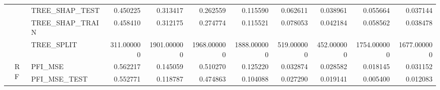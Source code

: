 \begin{table}
\begin{tabular}{lllrrrrrrrr}
 &  & TREE\_SHAP\_TEST & {\cellcolor[HTML]{B40426}} \color[HTML]{F1F1F1} 0.450225 & {\cellcolor[HTML]{F7B79B}} \color[HTML]{000000} 0.313417 & {\cellcolor[HTML]{E8D6CC}} \color[HTML]{000000} 0.262559 & {\cellcolor[HTML]{779AF7}} \color[HTML]{F1F1F1} 0.115590 & {\cellcolor[HTML]{4C66D6}} \color[HTML]{F1F1F1} 0.062611 & {\cellcolor[HTML]{3C4EC2}} \color[HTML]{F1F1F1} 0.038961 & {\cellcolor[HTML]{485FD1}} \color[HTML]{F1F1F1} 0.055664 & {\cellcolor[HTML]{3B4CC0}} \color[HTML]{F1F1F1} 0.037144 \\
 &  & TREE\_SHAP\_TRAIN & {\cellcolor[HTML]{B40426}} \color[HTML]{F1F1F1} 0.458410 & {\cellcolor[HTML]{F6BDA2}} \color[HTML]{000000} 0.312175 & {\cellcolor[HTML]{ECD3C5}} \color[HTML]{000000} 0.274774 & {\cellcolor[HTML]{7597F6}} \color[HTML]{F1F1F1} 0.115521 & {\cellcolor[HTML]{5875E1}} \color[HTML]{F1F1F1} 0.078053 & {\cellcolor[HTML]{3D50C3}} \color[HTML]{F1F1F1} 0.042184 & {\cellcolor[HTML]{4961D2}} \color[HTML]{F1F1F1} 0.058562 & {\cellcolor[HTML]{3B4CC0}} \color[HTML]{F1F1F1} 0.038478 \\
 &  & TREE\_SPLIT & {\cellcolor[HTML]{3B4CC0}} \color[HTML]{F1F1F1} 311.000000 & {\cellcolor[HTML]{C32E31}} \color[HTML]{F1F1F1} 1901.000000 & {\cellcolor[HTML]{B40426}} \color[HTML]{F1F1F1} 1968.000000 & {\cellcolor[HTML]{C53334}} \color[HTML]{F1F1F1} 1888.000000 & {\cellcolor[HTML]{6282EA}} \color[HTML]{F1F1F1} 519.000000 & {\cellcolor[HTML]{5470DE}} \color[HTML]{F1F1F1} 452.000000 & {\cellcolor[HTML]{DF634E}} \color[HTML]{F1F1F1} 1754.000000 & {\cellcolor[HTML]{E9785D}} \color[HTML]{F1F1F1} 1677.000000 \\
\cline{2-11}
 & \multirow[c]{9}{*}{RF} & PFI\_MSE & {\cellcolor[HTML]{B40426}} \color[HTML]{F1F1F1} 0.562217 & {\cellcolor[HTML]{86A9FC}} \color[HTML]{F1F1F1} 0.145059 & {\cellcolor[HTML]{D55042}} \color[HTML]{F1F1F1} 0.510270 & {\cellcolor[HTML]{7A9DF8}} \color[HTML]{F1F1F1} 0.125220 & {\cellcolor[HTML]{4257C9}} \color[HTML]{F1F1F1} 0.032874 & {\cellcolor[HTML]{3F53C6}} \color[HTML]{F1F1F1} 0.028582 & {\cellcolor[HTML]{3B4CC0}} \color[HTML]{F1F1F1} 0.018145 & {\cellcolor[HTML]{4257C9}} \color[HTML]{F1F1F1} 0.031152 \\
 &  & PFI\_MSE\_TEST & {\cellcolor[HTML]{B40426}} \color[HTML]{F1F1F1} 0.552771 & {\cellcolor[HTML]{7EA1FA}} \color[HTML]{F1F1F1} 0.118787 & {\cellcolor[HTML]{E26952}} \color[HTML]{F1F1F1} 0.474863 & {\cellcolor[HTML]{7597F6}} \color[HTML]{F1F1F1} 0.104088 & {\cellcolor[HTML]{465ECF}} \color[HTML]{F1F1F1} 0.027290 & {\cellcolor[HTML]{4257C9}} \color[HTML]{F1F1F1} 0.019141 & {\cellcolor[HTML]{3B4CC0}} \color[HTML]{F1F1F1} 0.005400 & {\cellcolor[HTML]{3E51C5}} \color[HTML]{F1F1F1} 0.012083 \\

\end{tabular}
\end{table}

